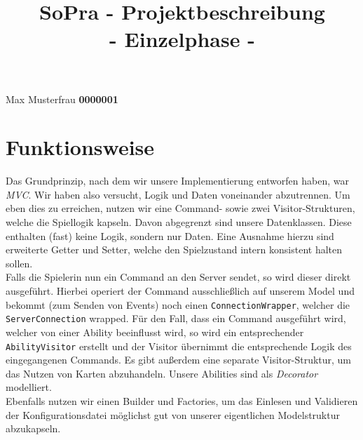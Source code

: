 \documentclass[10pt,a4paper]{article}
\begin{document}
\title{SoPra - \textbf{Projektbeschreibung}\\ - Einzelphase -}
\renewcommand\maketitlehookc{\vspace{-9ex}}
\maketitle

\begin{center}
    Max Musterfrau \textbf{0000001}
\end{center}


\section*{Funktionsweise}
\noindent Das Grundprinzip, nach dem wir unsere Implementierung entworfen haben, war \emph{MVC}. Wir haben also versucht, Logik und Daten voneinander
abzutrennen. Um eben dies zu erreichen, nutzen wir eine Command- sowie zwei Visitor-Strukturen, welche die Spiellogik
kapseln. Davon abgegrenzt sind unsere Datenklassen. Diese enthalten (fast) keine Logik, sondern nur Daten. Eine Ausnahme hierzu sind
erweiterte Getter und Setter, welche den Spielzustand intern konsistent halten sollen.\\
Falls die Spielerin nun ein Command an den Server sendet, so wird dieser direkt ausgeführt. Hierbei operiert der Command ausschließlich
auf unserem Model und bekommt (zum Senden von Events) noch einen \linebreak \texttt{ConnectionWrapper}, welcher die \texttt{ServerConnection} wrapped.
Für den Fall, dass ein Command ausgeführt wird, welcher von einer Ability beeinflusst wird, so wird ein entsprechender \texttt{AbilityVisitor}
erstellt und der Visitor übernimmt die entsprechende Logik des eingegangenen Commands. Es gibt außerdem eine separate Visitor-Struktur,
um das Nutzen von Karten abzuhandeln. Unsere Abilities sind als \emph{Decorator} modelliert.\\
Ebenfalls nutzen wir einen Builder und Factories, um das Einlesen und Validieren der Konfigurationsdatei möglichst gut von unserer eigentlichen
Modelstruktur abzukapseln.
\end{document}
